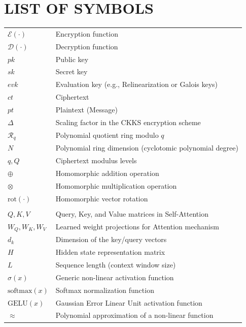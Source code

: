 \chapter*{LIST OF SYMBOLS}

\begin{longtable}{@{}p{3.5cm}p{11cm}@{}}
$\mathcal{E}(\cdot)$ & Encryption function \\
$\mathcal{D}(\cdot)$ & Decryption function \\
$pk$                 & Public key \\
$sk$                 & Secret key \\
$evk$                & Evaluation key (e.g., Relinearization or Galois keys) \\
$ct$                 & Ciphertext \\
$pt$                 & Plaintext (Message) \\
$\Delta$             & Scaling factor in the CKKS encryption scheme \\
$\mathcal{R}_q$      & Polynomial quotient ring modulo $q$ \\
$N$                  & Polynomial ring dimension (cyclotomic polynomial degree) \\
$q, Q$               & Ciphertext modulus levels \\
$\oplus$             & Homomorphic addition operation \\
$\otimes$            & Homomorphic multiplication operation \\
$\text{rot}(\cdot)$  & Homomorphic vector rotation \\
\\
$Q, K, V$            & Query, Key, and Value matrices in Self-Attention \\
$W_Q, W_K, W_V$      & Learned weight projections for Attention mechanism \\
$d_k$                & Dimension of the key/query vectors \\
$H$                  & Hidden state representation matrix \\
$L$                  & Sequence length (context window size) \\
$\sigma(x)$          & Generic non-linear activation function \\
$\text{softmax}(x)$  & Softmax normalization function \\
$\text{GELU}(x)$     & Gaussian Error Linear Unit activation function \\
$\approx$            & Polynomial approximation of a non-linear function \\
\end{longtable}